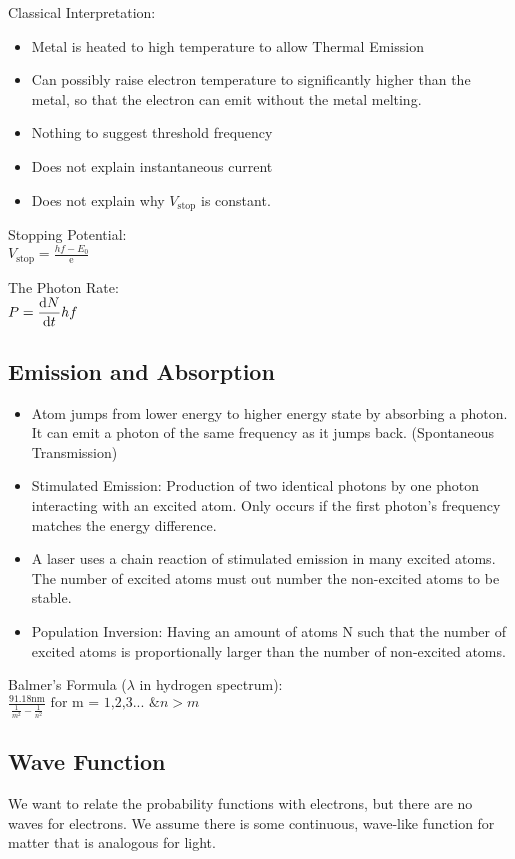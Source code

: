 \documentclass[12pt,landscape]{article}
\newcommand{\tab}{\hspace{.02\textwidth}}
\newcommand{\ds}{\displaystyle}
\begin{document}
\begin{multicols}{3}
	Classical Interpretation:
	\begin{itemize}[leftmargin=0.5cm]
		\itemsep0em
		\item Metal is heated to high temperature to allow Thermal Emission
		\item Can possibly raise electron temperature to significantly higher than the metal, so that the electron can emit without the metal melting.
		\item Nothing to suggest threshold frequency
		\item Does not explain instantaneous current
		\item Does not explain why $V_{\text{stop}}$ is constant.
	\end{itemize}

	Stopping Potential:\\
	\tab $\ds V_{\text{stop}} = \frac{hf - E_0}{\text{e}}$
	
	The Photon Rate:\\
	\tab $\ds P = \dv{N}{t} hf$
	
	\subsection{Emission and Absorption}
	\begin{itemize}[leftmargin=0.5cm]
		\itemsep0em
		\item Atom jumps from lower energy to higher energy state by absorbing a photon. It can emit a photon of the same frequency as it jumps back. (Spontaneous Transmission)
		\item Stimulated Emission: Production of two identical photons by one photon interacting with an excited atom. Only occurs if the first photon's frequency matches the energy difference.
		\item A laser uses a chain reaction of stimulated emission in many excited atoms. The number of excited atoms must out number the non-excited atoms to be stable.
		\item Population Inversion: Having an amount of atoms N such that the number of excited atoms is proportionally larger than the number of non-excited atoms.
	\end{itemize}
	
	Balmer's Formula ($\lambda$ in hydrogen spectrum):\\
	\tab $\ds \frac{91.18\text{nm}}{\frac{1}{m^2} - \frac{1}{n^2}} \text{ for m = 1,2,3... \& } n > m$
	
	\subsection{Wave Function}
	We want to relate the probability functions with electrons, but there are no waves for electrons. We assume there is some continuous, wave-like function for matter that is analogous for light.
	

\end{multicols}
\end{document}
